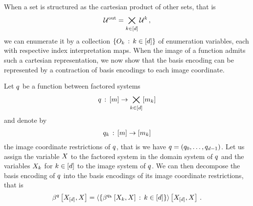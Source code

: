 
When a set is structured as the cartesian product of other sets, that is
\begin{align*}
    \mathcal{U}^{\mathrm{out}} = \bigtimes_{k\in[d]} \mathcal{U}^{k} \, ,
\end{align*}
we can enumerate it by a collection $\{O_{k} \,:\, k\in[d]\}$ of enumeration variables, each with respective index interpretation maps.
When the image of a function admits such a cartesian representation, we now show that the basis encoding can be represented by a contraction of basis encodings to each image coordinate.

\begin{theorem}
    \label{the:functionImageDecompositionContraction}
    Let $q$ be a function between factored systems
    \begin{align*}
        q\,:\, [m] \rightarrow  \bigtimes_{k\in[d]}[m_{k}]
    \end{align*}
    and denote by
    \begin{align*}
        q_{k}\,:\, [m] \rightarrow [m_{k}]
    \end{align*}
    the image coordinate restrictions of $q$, that is we have $q=(q_{0},\ldots,q_{d-1})$.
    Let us assign the variable $X$ to the factored system in the domain system of $q$ and the variables $X_{k}$ for $k\in[d]$ to the image system of $q$.
    We can then decompose the basis encoding of $q$ into the basis encodings of its image coordinate restrictions, that is
    \begin{align*}
        \beta^{q}\left[X_{[d]},X\right]
        = \left\langle 
            \{\beta^{q_{k}}\left[X_{k},X\right] \,:\, k\in[d] \}
        \right\rangle \left[ X_{[d]},X \right] \, .
    \end{align*}
\end{theorem}

